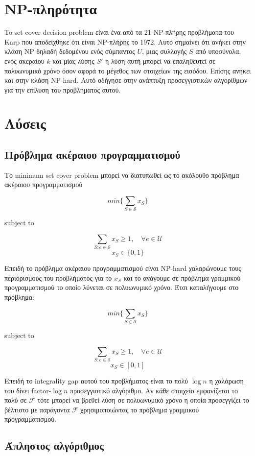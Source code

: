 \section{NP-πληρότητα}

To set cover decision problem είναι ένα από τα 21 NP-πλήρης προβλήματα του Karp που αποδείχθηκε ότι είναι NP-πλήρης το 1972. Αυτό σημαίνει ότι ανήκει στην κλάση NP δηλαδή δεδομένου ενός σύμπαντος $U$, μιας συλλογής $S$ από υποσύνολα, ενός ακεραίου $k$ και μίας λύσης $S'$ η λύση αυτή μπορεί να επαληθευτεί σε πολυωνυμικό χρόνο όσον αφορά το μέγεθος των στοιχείων της εισόδου. Επίσης ανήκει και στην κλάση NP-hard. Αυτό οδήγησε στην ανάπτυξη προσεγγιστικών αλγορίθμων για την επίλυση του προβλήματος αυτού.


\section{Λύσεις}

\subsection{Πρόβλημα ακέραιου προγραμματισμού}

Το minimum set cover problem μπορεί να διατυπωθεί ως το ακόλουθο πρόβλημα ακέραιου προγραμματισμού

$$min\{\displaystyle\sum_{S\in{\mathcal{S}}} x_S\}$$ 
\centerline{subject to}
$$\displaystyle\sum_{S:e\in{\mathcal{S}}} x_S \geq{1}, \quad \forall e \in{\mathcal{U}}$$
$$ x_S \in{\{0, 1\}}$$

Επειδή το πρόβλημα ακέραιου προγραμματισμού είναι NP-hard χαλαρώνουμε τους περιορισμούς του προβλήματος για το $x_S$ και το ανάγουμε σε πρόβλημα γραμμικού προγραμματισμού το οποίο λύνεται σε πολυωνυμικό χρόνο. Έτσι καταλήγουμε στο πρόβλημα:

$$min\{\displaystyle\sum_{S\in{\mathcal{S}}} x_S\}$$ 
\centerline{subject to}
$$\displaystyle\sum_{S:e\in{\mathcal{S}}} x_S \geq{1}, \quad \forall e \in{\mathcal{U}}$$
$$ x_S \in{[0, 1]}$$

Επειδή το integrality gap αυτού του προβλήματος είναι το πολύ $\log{n}$ η χαλάρωση του δίνει factor-$\log{n}$ προσεγγιστικό αλγόριθμο.
Αν κάθε στοιχείο εμφανίζεται το πολύ σε ${\mathcal{F}}$ τότε μπορεί να βρεθεί λύση σε πολυωνυμικό χρόνο η οποία προσεγγίζει το βέλτιστο με παράγοντα ${\mathcal{F}}$ χρησιμοποιώντας το πρόβλημα γραμμικού προγραμματισμού.

\subsection{Άπληστος αλγόριθμος} 

